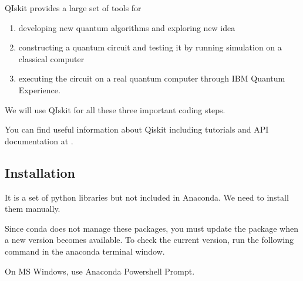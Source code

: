 \documentclass[letterpaper,10pt,english]{jupyterBook}
\begin{document}
\sphinxAtStartPar
QIskit provides a large set of tools for
\begin{enumerate}
%
\item {}
\sphinxAtStartPar
developing new quantum algorithms and exploring new idea

\item {}
\sphinxAtStartPar
constructing a quantum circuit and testing it by running simulation on a classical computer

\item {}
\sphinxAtStartPar
executing the circuit on a real quantum computer through IBM Quantum Experience.

\end{enumerate}

\sphinxAtStartPar
We will use QIskit for all these three important coding steps.

\sphinxAtStartPar
You can find useful information about Qiskit including tutorials and API documentation at .


\subsection{Installation}
\label{\detokenize{preparation/qiskit:installation}}
\sphinxAtStartPar
It is a set of python libraries but not included in Anaconda.  We need to install them manually.

\begin{sphinxVerbatim}[commandchars=\\\{\}]
  
  \PYG{p}{[}\PYG{p}{]}
\end{sphinxVerbatim}

\sphinxAtStartPar
Since conda does not manage these packages, you must update the package when a new version becomes available.  To check the current version, run the following command in the anaconda terminal window.

\sphinxAtStartPar
On MS Windows, use Anaconda Powershell Prompt.

\begin{sphinxVerbatim}[commandchars=\\\{\}]
    

                            
                        
              
                      
                      
\end{sphinxVerbatim}
\end{document}
